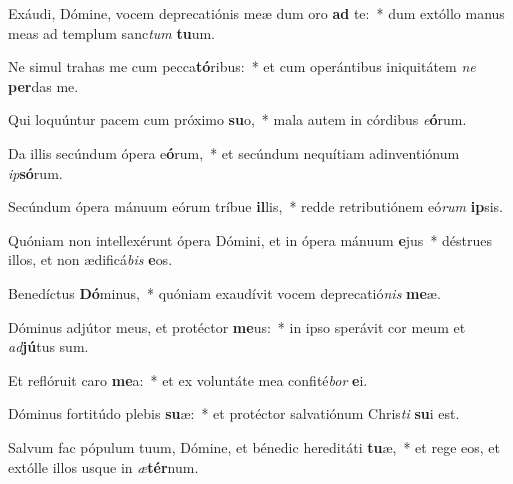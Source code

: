 \item Exáudi, Dómine, vocem deprecatiónis meæ dum oro \textbf{ad} te:~* dum extóllo manus meas ad templum sanc\textit{tum} \textbf{tu}um.
\item Ne simul trahas me cum pecca\textbf{tó}ribus:~* et cum operántibus iniquitátem \textit{ne} \textbf{per}das me.
\item Qui loquúntur pacem cum próximo \textbf{su}o,~* mala autem in córdibus \textit{e}\textbf{ó}rum.
\item Da illis secúndum ópera e\textbf{ó}rum,~* et secúndum nequítiam adinventiónum \textit{ip}\textbf{só}rum.
\item Secúndum ópera mánuum eórum tríbue \textbf{il}lis,~* redde retributiónem eó\textit{rum} \textbf{ip}sis.
\item Quóniam non intellexérunt ópera Dómini, et in ópera mánuum \textbf{e}jus~* déstrues illos, et non ædificá\textit{bis} \textbf{e}os.
\item Benedíctus \textbf{Dó}minus,~* quóniam exaudívit vocem deprecatió\textit{nis} \textbf{me}æ.
\item Dóminus adjútor meus, et protéctor \textbf{me}us:~* in ipso sperávit cor meum et \textit{ad}\textbf{jú}tus sum.
\item Et reflóruit caro \textbf{me}a:~* et ex voluntáte mea confité\textit{bor} \textbf{e}i.
\item Dóminus fortitúdo plebis \textbf{su}æ:~* et protéctor salvatiónum Chris\textit{ti} \textbf{su}i est.
\item Salvum fac pópulum tuum, Dómine, et bénedic hereditáti \textbf{tu}æ,~* et rege eos, et extólle illos usque in \textit{æ}\textbf{tér}num.
